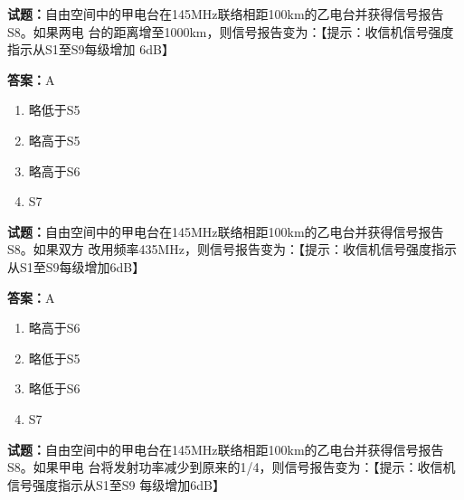 \documentclass{ctexbook}
\begin{document}




\vspace{1em}

\textbf{试题：}自由空间中的甲电台在145MHz联络相距100km的乙电台并获得信号报告S8。如果两电
台的距离增至1000km，则信号报告变为：【提示：收信机信号强度指示从S1至S9每级增加
6dB】 

\textbf{答案：}A 

\begin{enumerate}[leftmargin=3em]
  \item 略低于S5 

  \item 略高于S5 

  \item 略高于S6 

  \item S7 

\end{enumerate}





\vspace{1em}

\textbf{试题：}自由空间中的甲电台在145MHz联络相距100km的乙电台并获得信号报告S8。如果双方
改用频率435MHz，则信号报告变为：【提示：收信机信号强度指示从S1至S9每级增加6dB】 

\textbf{答案：}A 

\begin{enumerate}[leftmargin=3em]
  \item 略高于S6 

  \item 略低于S5 

  \item 略低于S6 

  \item S7 

\end{enumerate}





\vspace{1em}

\textbf{试题：}自由空间中的甲电台在145MHz联络相距100km的乙电台并获得信号报告S8。如果甲电
台将发射功率减少到原来的1/4，则信号报告变为：【提示：收信机信号强度指示从S1至S9
每级增加6dB】 
\end{document}
